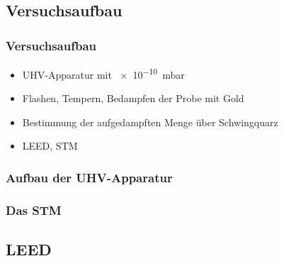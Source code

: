 \documentclass{beamer}
\begin{document}
\subsection[Versuchsaufbau]{Versuchsaufbau}

\begin{frame}
\frametitle{Versuchsaufbau}
\begin{itemize}\setlength{\itemsep}{+15pt}
  \item UHV-Apparatur mit \SI{e-10}{mbar}
  \item Flashen, Tempern, Bedampfen der Probe mit Gold
  \item Bestimmung der aufgedampften Menge über Schwingquarz
  \item LEED, STM
\end{itemize}
\end{frame}

\begin{frame}
\frametitle{Aufbau der UHV-Apparatur}
\begin{figure}[H]
\centering
\sffamily

\end{figure}
\end{frame}

\begin{frame}
\frametitle{Das STM}
\begin{figure}[H]
\centering
\sffamily

\end{figure}
\end{frame}



\subsection[Ergebnisse]{LEED}
\end{document}
